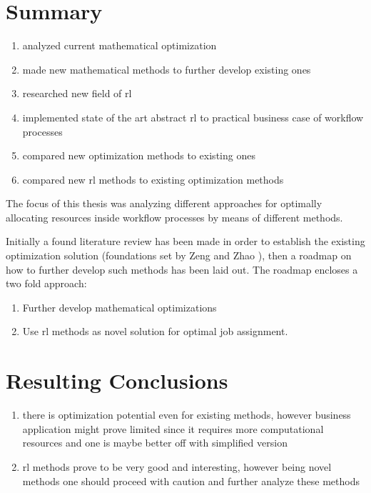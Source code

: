 \documentclass{seal_thesis}
\begin{document}
\section{Summary}

\begin{enumerate}
	\item analyzed current mathematical optimization
	\item made new mathematical methods to further develop existing ones
	\item researched new field of \gls{rl}
	\item implemented state of the art abstract \gls{rl} to practical business case of workflow processes
	\item compared new optimization methods to existing ones
	\item compared new \gls{rl} methods to existing optimization methods
\end{enumerate}

The focus of this thesis was analyzing different approaches for optimally allocating resources inside workflow processes by means of different methods.

Initially a found literature review has been made in order to establish the existing optimization solution (\ie foundations set by Zeng and Zhao \cite{Zeng2005}), then a roadmap on how to further develop such methods has been laid out. The roadmap encloses a two fold approach:
\begin{enumerate}
 	\item Further develop mathematical optimizations
 	\item Use \gls{rl} methods as novel solution for optimal job assignment.
 \end{enumerate} 

\section{Resulting Conclusions}

\begin{enumerate}
	\item there is optimization potential even for existing methods, however business application might prove limited since it requires more computational resources and one is maybe better off with simplified version
	\item \gls{rl} methods prove to be very good and interesting, however being novel methods one should proceed with caution and further analyze these methods
\end{enumerate}
\end{document}
